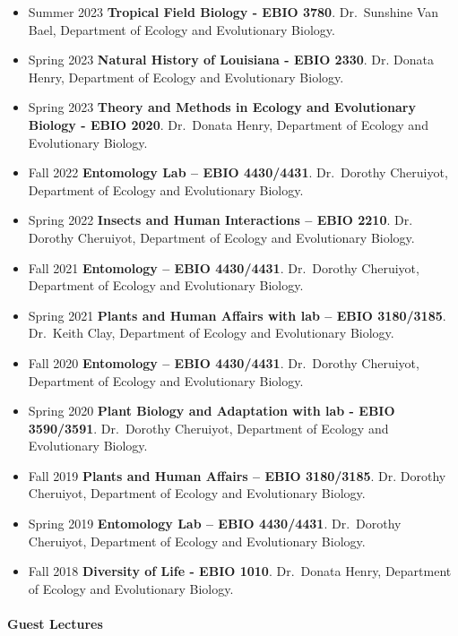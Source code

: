 \documentclass[11pt,a4paper,]{awesome-cv}
\begin{document}
\begin{itemize}
\item
  Summer 2023 \textbar{} \textbf{Tropical Field Biology - EBIO 3780}.
  Dr.~Sunshine Van Bael, Department of Ecology and Evolutionary Biology.
\item
  Spring 2023 \textbar{} \textbf{Natural History of Louisiana - EBIO
  2330}. Dr. Donata Henry, Department of Ecology and Evolutionary
  Biology.
\item
  Spring 2023 \textbar{} \textbf{Theory and Methods in Ecology and
  Evolutionary Biology - EBIO 2020}. Dr.~Donata Henry, Department of
  Ecology and Evolutionary Biology.
\item
  Fall 2022 \textbar{} \textbf{Entomology Lab -- EBIO 4430/4431}.
  Dr.~Dorothy Cheruiyot, Department of Ecology and Evolutionary Biology.
\item
  Spring 2022 \textbar{} \textbf{Insects and Human Interactions -- EBIO
  2210}. Dr. Dorothy Cheruiyot, Department of Ecology and Evolutionary
  Biology.
\item
  Fall 2021 \textbar{} \textbf{Entomology -- EBIO 4430/4431}.
  Dr.~Dorothy Cheruiyot, Department of Ecology and Evolutionary Biology.
\item
  Spring 2021 \textbar{} \textbf{Plants and Human Affairs with lab --
  EBIO 3180/3185}. Dr.~Keith Clay, Department of Ecology and
  Evolutionary Biology.
\item
  Fall 2020 \textbar{} \textbf{Entomology -- EBIO 4430/4431}.
  Dr.~Dorothy Cheruiyot, Department of Ecology and Evolutionary Biology.
\item
  Spring 2020 \textbar{} \textbf{Plant Biology and Adaptation with lab -
  EBIO 3590/3591}. Dr.~Dorothy Cheruiyot, Department of Ecology and
  Evolutionary Biology.
\item
  Fall 2019 \textbar{} \textbf{Plants and Human Affairs -- EBIO
  3180/3185}. Dr. Dorothy Cheruiyot, Department of Ecology and
  Evolutionary Biology.
\item
  Spring 2019 \textbar{} \textbf{Entomology Lab -- EBIO 4430/4431}.
  Dr.~Dorothy Cheruiyot, Department of Ecology and Evolutionary Biology.
\item
  Fall 2018 \textbar{} \textbf{Diversity of Life - EBIO 1010}.
  Dr.~Donata Henry, Department of Ecology and Evolutionary Biology.
\end{itemize}

\hypertarget{guest-lectures}{%
\paragraph{Guest Lectures}\label{guest-lectures}}
\end{document}
